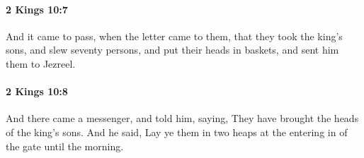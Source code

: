 		\paragraph{2 Kings 10:7} %
			\label{2KINGS-10-7}

			And it came to pass, when the letter came to them, that they took the king’s sons, and slew seventy persons, and put their heads in baskets, and sent him them to Jezreel.


		\paragraph{2 Kings 10:8} %
			\label{2KINGS-10-8}

			And there came a messenger, and told him, saying, They have brought the heads of the king’s sons. And he said, Lay ye them in two heaps at the entering in of the gate until the morning.


